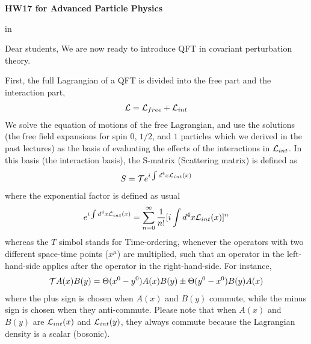 \documentclass[12pt]{article}
\begin{document}
\begin{center}
{\large\bf HW17 for Advanced Particle Physics} \\

\end{center}

 in

Dear students,
We are now ready to introduce QFT in covariant perturbation theory.

  First, the full Lagrangian of a QFT is divided into the free part
  and the interaction part,
\begin{eqnarray}
  {\cal L} = {\cal L}_{free} + {\cal L}_{int} \label{eq.17_1}
\end{eqnarray}
  We solve the equation of motions of the free Lagrangian, and use the
  solutions (the free field expansions for spin $0$, $1/2$, and $1$ particles
  which we derived in the past lectures) as the basis of evaluating
  the effects of the interactions in ${\cal L}_{int}$.  In this basis (the
  interaction basis), the S-matrix (Scattering matrix) is defined as
\begin{eqnarray}
  S = {\cal T} e^{ i\int d^4x {\cal L}_{int}(x) } \label{eq.17_2}
\end{eqnarray}
    where the exponential factor is defined as usual
\begin{eqnarray}
  e^{ i\int d^4x {\cal L}_{int}(x) }
  =
  \sum_{n=0}^\infty \frac{1}{n!} [i\int d^4x {\cal L}_{int}(x)]^n \label{eq.17_3}
\end{eqnarray}
    whereas the $T$ simbol stands for Time-ordering, whenever the operators
  with two different space-time points ($x^\mu$) are multiplied, such that
  an operator in the left-hand-side applies after the operator in the
  right-hand-side. For instance,
\begin{eqnarray}
  {\cal T} A(x) B(y) =   \Theta(x^0-y^0) A(x) B(y)
                 \pm \Theta(y^0-x^0) B(y) A(x) \label{eq.17_4}
\end{eqnarray}
  where the plus sign is chosen when $A(x)$ and $B(y)$ commute, while the
  minus sign is chosen when they anti-commute.  Please note that when
  $A(x)$ and $B(y)$ are ${\cal L}_{int}(x)$ and ${\cal L}_{int}(y)$, they always commute because
  the Lagrangian density is a scalar (bosonic).
\end{document}
